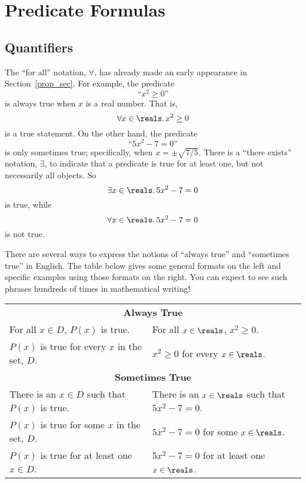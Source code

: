 \section{Predicate Formulas}\label{predicate_sec}

\subsection{Quantifiers}\label{quantifier_sec}
The ``for all'' notation, $\forall$, has already made an early
appearance in Section~\ref{prop_sec}.  For example, the predicate
\[
\text{``$x^2 \geq 0$''}
\]
is always true when $x$ is a real number.  That is,
\[
\forall x \in \reals.\, x^2 \geq 0
\]
is a true statement.  On the other hand, the predicate
\[
\text{``$5x^2 - 7 = 0$''}
\]
is only sometimes true; specifically, when $x = \pm \sqrt{7/5}$.
There is a ``there exists'' notation, $\exists$, to indicate that a
predicate is true for at least one, but not necessarily all objects.
So 
\[
\exists x \in \reals.\, 5x^2 - 7 = 0
\]
is true, while
\[
\forall x \in \reals.\, 5x^2 - 7 = 0
\]
is not true.

There are several ways to express the notions of ``always true'' and
``sometimes true'' in English.  The table below gives some general
formats on the left and specific examples using those formats on the
right.  You can expect to see such phrases hundreds of times in
mathematical writing!
\begin{center}
\begin{tabular}{ll}
\multicolumn{2}{c}{\textbf{Always True}} \\[1ex]
For all $x \in D$, $P(x)$ is true. & For all $x \in \reals$, $x^2 \geq 0$. \\
$P(x)$ is true for every $x$ in the set, $D$. & $x^2 \geq 0$ for every $x \in \reals$. \\[2ex]
\multicolumn{2}{c}{\textbf{Sometimes True}} \\[1ex]
There is an $x \in D$ such that $P(x)$ is true. & There is an $x \in \reals$ such that $5x^2 - 7 = 0$.\\
$P(x)$ is true for some $x$ in the set, $D$. & $5x^2 - 7 = 0$ for some $x \in \reals$.\\
$P(x)$ is true for at least one $x \in D$. & $5x^2-7=0$ for at least one $x \in \reals$.
\end{tabular}
\end{center}

